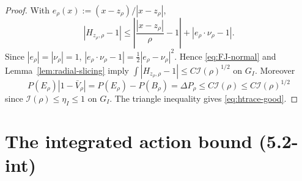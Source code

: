 \documentclass[11pt]{article}
\theoremstyle{definition}
\begin{document}
\begin{proof}
With $e_\rho(x):=(x-z_\rho)/|x-z_\rho|$,
\[
   |H_{z_\rho,\rho}-1|
   \le \left|\frac{|x-z_\rho|}{\rho}-1\right|
      + |e_\rho\cdot\nu_\rho-1|.
\]
Since $|e_\rho|=|\nu_\rho|=1$,
$|e_\rho\cdot\nu_\rho-1|=\frac12|e_\rho-\nu_\rho|^2$.  Hence
\eqref{eq:FJ-normal} and Lemma~\ref{lem:radial-slicing} imply
$\int|H_{z_\rho,\rho}-1|\le C\mathcal I(\rho)^{1/2}$ on $G_I$.  Moreover
\[
   P(E_\rho)|1-\bar V_\rho|=P(E_\rho)-P(B_\rho)=\Delta P_\rho
   \le C\mathcal I(\rho)\le C\mathcal I(\rho)^{1/2}
\]
since $\mathcal I(\rho)\le\eta_I\le 1$ on $G_I$.  The triangle
inequality gives \eqref{eq:htrace-good}.
\end{proof}

\fi

\section{The integrated action bound (5.2-int)}\label{sec:52int}
\end{document}
